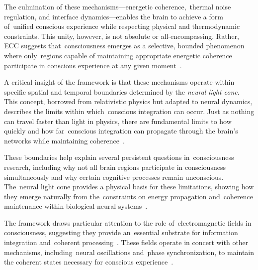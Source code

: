 The culmination of these mechanisms—energetic coherence,~thermal noise regulation, and interface dynamics—enables the brain to achieve a form of~unified conscious experience while respecting physical and thermodynamic constraints. This unity, however, is not absolute or all-encompassing. Rather, ECC suggests that~consciousness emerges as a selective, bounded phenomenon where only~regions capable of maintaining appropriate energetic coherence participate in conscious experience at any given moment~\cite{baars2013global}.

A critical insight of the framework is that these mechanisms operate within specific spatial and temporal boundaries determined by the \textit{neural light cone}. This concept, borrowed from relativistic physics but adapted to neural dynamics, describes the limits within which~conscious integration can occur. Just as nothing can travel faster than light in physics, there are fundamental limits to how quickly and how far~conscious integration can propagate through the brain's networks while maintaining coherence~\cite{zheng2025unbearable}.

These boundaries help explain several persistent questions in~consciousness research, including why not all brain regions participate in consciousness simultaneously and why certain cognitive processes remain unconscious. The~neural light cone provides a physical basis for these limitations, showing how they emerge naturally from the~constraints on energy propagation and~coherence maintenance within biological neural systems~\cite{dehaene2011}.

The framework draws particular attention to the role of~electromagnetic fields in consciousness, suggesting they provide an~essential substrate for information integration and~coherent processing~\cite{mcfadden2020integrating, hunt2024electromagnetic}. These fields operate in concert with other mechanisms, including~neural oscillations and~phase synchronization, to maintain the coherent states necessary for conscious experience~\cite{pinotsis2023cytoelectric}.

